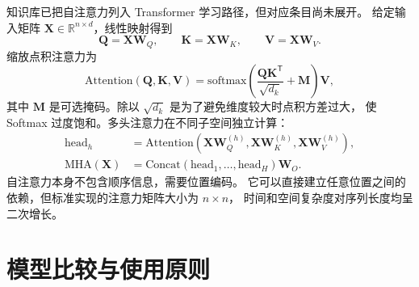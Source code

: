 \documentclass[UTF8,zihao=-4,a4paper,fontset=windows]{ctexart}
\newcommand{\R}{\mathbb{R}}
\begin{document}
知识库已把自注意力列入 Transformer 学习路径，但对应条目尚未展开\cite{aikb}。
给定输入矩阵 $\bm{X}\in\R^{n\times d}$，线性映射得到
\begin{equation}
  \bm{Q}=\bm{X}\bm{W}_Q,\qquad
  \bm{K}=\bm{X}\bm{W}_K,\qquad
  \bm{V}=\bm{X}\bm{W}_V.
\end{equation}
缩放点积注意力为\cite{vaswani}
\begin{equation}
  \mathrm{Attention}(\bm{Q},\bm{K},\bm{V})
  =\mathrm{softmax}\left(
  \frac{\bm{Q}\bm{K}^{\mathsf T}}{\sqrt{d_k}}
  +\bm{M}
  \right)\bm{V},
  \label{eq:attention}
\end{equation}
其中 $\bm{M}$ 是可选掩码。除以 $\sqrt{d_k}$ 是为了避免维度较大时点积方差过大，
使 Softmax 过度饱和。多头注意力在不同子空间独立计算：
\begin{align}
  \mathrm{head}_h
  &=\mathrm{Attention}
  (\bm{X}\bm{W}_Q^{(h)},
   \bm{X}\bm{W}_K^{(h)},
   \bm{X}\bm{W}_V^{(h)}),\\
  \mathrm{MHA}(\bm{X})
  &=\mathrm{Concat}(\mathrm{head}_1,\ldots,\mathrm{head}_H)
  \bm{W}_O.
\end{align}
自注意力本身不包含顺序信息，需要位置编码。
它可以直接建立任意位置之间的依赖，但标准实现的注意力矩阵大小为 $n\times n$，
时间和空间复杂度对序列长度均呈二次增长。

\section{模型比较与使用原则}
\end{document}
